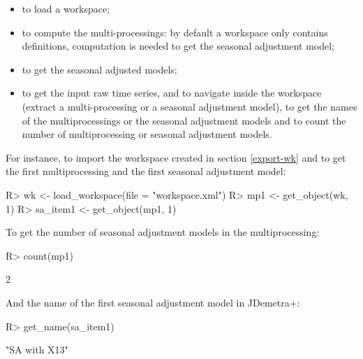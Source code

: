 \documentclass[article]{jss}
\providecommand{\tightlist}{%
  \setlength{\itemsep}{0pt}\setlength{\parskip}{0pt}}
\begin{document}
\begin{itemize}
\tightlist
\item
   to load a workspace;\\
\item
   to compute the multi-processings: by default a
  workspace only contains definitions, computation is needed to get the
  seasonal adjustment model;\\
\item
   to get the seasonal adjusted models;\\
\item
   to get the input raw time series, 
  and  to navigate inside the workspace (extract a
  multi-processing or a seasonal adjustment model),  to
  get the names of the multiprocessings or the seasonal adjustment
  models and  to count the number of multiprocessing or
  seasonal adjustment models.
\end{itemize}

For instance, to import the workspace created in section \ref{export-wk}
and to get the first multiprocessing and the first seasonal adjustment
model:

\begin{CodeChunk}

\begin{CodeInput}
R> wk <- load_workspace(file =  "workspace.xml")
R> mp1 <- get_object(wk, 1)
R> sa_item1 <- get_object(mp1, 1)
\end{CodeInput}
\end{CodeChunk}

To get the number of seasonal adjustment models in the multiprocessing:

\begin{CodeChunk}

\begin{CodeInput}
R> count(mp1)
\end{CodeInput}

\begin{CodeOutput}
[1] 2
\end{CodeOutput}
\end{CodeChunk}

And the name of the first seasonal adjustment model in JDemetra+:

\begin{CodeChunk}

\begin{CodeInput}
R> get_name(sa_item1) 
\end{CodeInput}

\begin{CodeOutput}
[1] "SA with X13"
\end{CodeOutput}
\end{CodeChunk}
\end{document}
